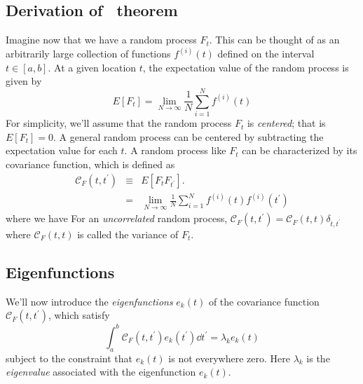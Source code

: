 \subsection{Derivation of \KL\ theorem}
Imagine now that we have a random process $F_t$.  This can be thought of as
an arbitrarily large collection of functions $f^{(i)}(t)$ defined
on the interval
$t \in [a, b]$.  At a given location $t$, the expectation value of the
random process is given by
\begin{equation}
  E[F_t] = \lim_{N \to \infty} \frac{1}{N} \sum_{i=1}^N f^{(i)}(t)
\end{equation}
For simplicity, we'll assume that the random process $F_t$ is {\it
centered}; that is $E[F_t] = 0$.  A general random process can be
centered by subtracting the expectation value for each $t$.
A random process like $F_t$ can be characterized
by its covariance function, which is defined as
\begin{eqnarray}
  \label{eq:corrfunc_def}
  \mathcal{C}_F(t, t^\prime) &\equiv& E[F_t F_{t^\prime}].
  \nonumber\\
  &=& \lim_{N\to\infty}\frac{1}{N} \sum_{i=1}^N
  f^{(i)}(t)f^{(i)}(t^\prime)
\end{eqnarray}
where we have 
For an {\it uncorrelated} random process,
$\mathcal{C}_F(t, t^\prime) = \mathcal{C}_F(t, t) \delta_{t, t^\prime}$
where $\mathcal{C}_F(t, t) $ is called the variance of $F_t$.

\subsection{Eigenfunctions}
We'll now introduce the {\it eigenfunctions} $e_k(t)$
of the covariance function $\mathcal{C}_F(t, t^\prime)$, which satisfy
\begin{equation}
  \label{eq:eigfunc_def}
  \int_a^b \mathcal{C}_F(t, t^\prime) e_k(t^\prime)\dd t^\prime
  = \lambda_k e_k(t)
\end{equation}
subject to the constraint that $e_k(t)$ is not everywhere zero.
Here $\lambda_k$ is the {\it eigenvalue} associated with the
eigenfunction $e_k(t)$.

